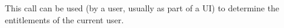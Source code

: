 This call can be used (by a user, usually as part of a UI) to determine the entitlements of the
current user.
